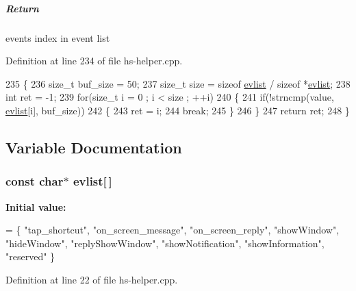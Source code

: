 \subparagraph*{Return}

event\textquotesingle{}s index in event list 

Definition at line 234 of file hs-\/helper.\+cpp.


\begin{DoxyCode}
235 \{
236     \textcolor{keywordtype}{size\_t} buf\_size = 50;
237     \textcolor{keywordtype}{size\_t} size = \textcolor{keyword}{sizeof} \hyperlink{hs-helper_8cpp_a0cd84b1a2184c9b84d1b7bf24582f28e}{evlist} / \textcolor{keyword}{sizeof} *\hyperlink{hs-helper_8cpp_a0cd84b1a2184c9b84d1b7bf24582f28e}{evlist};
238     \textcolor{keywordtype}{int} ret = -1;
239     \textcolor{keywordflow}{for}(\textcolor{keywordtype}{size\_t} i = 0 ; i < size ; ++i)
240     \{
241         \textcolor{keywordflow}{if}(!strncmp(value, \hyperlink{hs-helper_8cpp_a0cd84b1a2184c9b84d1b7bf24582f28e}{evlist}[i], buf\_size))
242         \{
243             ret = i;
244             \textcolor{keywordflow}{break};
245         \}
246     \}
247     \textcolor{keywordflow}{return} ret;
248 \}
\end{DoxyCode}


\subsection{Variable Documentation}
\subsubsection[{\texorpdfstring{evlist}{evlist}}]{\setlength{\rightskip}{0pt plus 5cm}const char$\ast$ evlist\mbox{[}$\,$\mbox{]}}\hypertarget{hs-helper_8cpp_a0cd84b1a2184c9b84d1b7bf24582f28e}{}\label{hs-helper_8cpp_a0cd84b1a2184c9b84d1b7bf24582f28e}
{\bfseries Initial value\+:}
\begin{DoxyCode}
= \{
    \textcolor{stringliteral}{"tap\_shortcut"},
    \textcolor{stringliteral}{"on\_screen\_message"},
    \textcolor{stringliteral}{"on\_screen\_reply"},
    \textcolor{stringliteral}{"showWindow"},
    \textcolor{stringliteral}{"hideWindow"},
    \textcolor{stringliteral}{"replyShowWindow"},
    \textcolor{stringliteral}{"showNotification"},
    \textcolor{stringliteral}{"showInformation"},
    \textcolor{stringliteral}{"reserved"}
  \}
\end{DoxyCode}


Definition at line 22 of file hs-\/helper.\+cpp.

